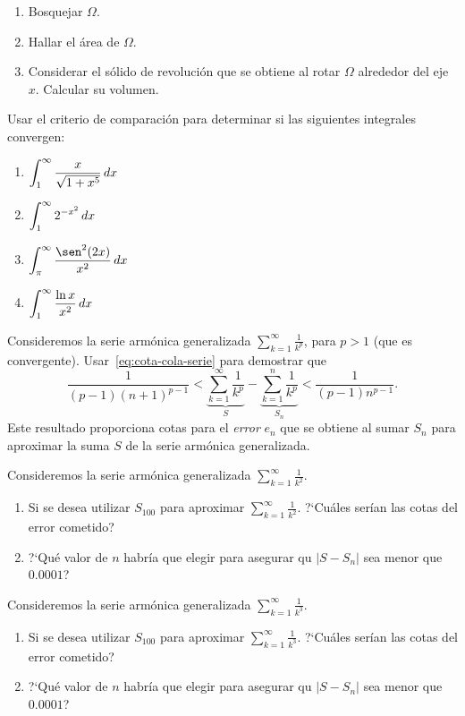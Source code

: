 \begin{enumerate}
  \item Bosquejar $\Omega$.
  \item Hallar el área de $\Omega$.
  \item Considerar el sólido de revolución que se obtiene al rotar $\Omega$ alrededor del eje $x$. Calcular su volumen.
\end{enumerate}
\item Usar el criterio de comparación para determinar si las siguientes integrales convergen:
\begin{multicols}{2}
  \begin{enumerate}
    \item $\displaystyle \int_1^\infty \frac{x}{\sqrt{1+x^5}}\,dx$
    \item $\displaystyle \int_1^\infty 2^{-x^2}\,dx$
    \item $\D \int_\pi^\infty \frac{\sen^2(2x)}{x^2}\dx$
    \item $\displaystyle \int_1^\infty \frac{\ln x}{x^2}\,dx$
  \end{enumerate}
  
\end{multicols}

\item Consideremos la serie armónica generalizada $\sum_{k=1}^\infty \frac1{k^p}$, para $p>1$ (que es convergente).
Usar~\eqref{eq:cota-cola-serie} para demostrar que
\[
\frac{1}{(p-1)(n+1)^{p-1}}
< \underbrace{\sum_{k=1}^\infty \frac1{k^p}}_S-\underbrace{\sum_{k=1}^n \frac1{k^p}}_{S_n}
< \frac{1}{(p-1)n^{p-1}}.
\]
Este resultado proporciona cotas para el \emph{error} $e_n$ que se obtiene al sumar $S_n$ para aproximar la suma $S$ de la serie armónica generalizada.

\item Consideremos la serie armónica generalizada $\sum_{k=1}^\infty \frac1{k^2}$.
\begin{enumerate}
  \item Si se desea utilizar $S_{100}$ para aproximar $\sum_{k=1}^\infty \frac1{k^2}$. ?`Cuáles serían las cotas del error cometido?
  \item ?`Qué valor de $n$ habría que elegir para asegurar qu $|S-S_n| $ sea menor que $0.0001$?
\end{enumerate}

\item Consideremos la serie armónica generalizada $\sum_{k=1}^\infty \frac1{k^3}$.
\begin{enumerate}
  \item Si se desea utilizar $S_{100}$ para aproximar $\sum_{k=1}^\infty \frac1{k^3}$. ?`Cuáles serían las cotas del error cometido?
  \item ?`Qué valor de $n$ habría que elegir para asegurar qu $|S-S_n| $ sea menor que $0.0001$?
\end{enumerate}